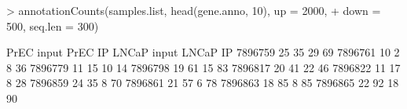 \begin{Schunk}
\begin{Sinput}
> annotationCounts(samples.list, head(gene.anno, 10), up = 2000, 
+     down = 500, seq.len = 300)
\end{Sinput}
\begin{Soutput}
        PrEC input PrEC IP LNCaP input LNCaP IP
7896759         25      35          29       69
7896761         10       2           8       36
7896779         11      15          10       14
7896798         19      61          15       83
7896817         20      41          22       46
7896822         11      17           8       28
7896859         24      35           8       70
7896861         21      57           6       78
7896863         18      85           8       85
7896865         22      92          18       90
\end{Soutput}
\end{Schunk}
